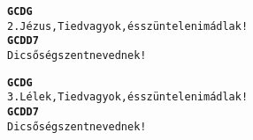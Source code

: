 \begin{minipage}{\textwidth}
\kottastart
{}
\kottaend
\begin{minipage}{\textwidth}
\begin{alltt}
\textbf{    G           C          D         G}
2. Jézus, Tied vagyok, és szüntelen imádlak!
\textbf{    G         C         D  D7}
   Dicsőség szent nevednek!
\end{alltt}
\vspace{0.0cm}
\versszakspacing
\end{minipage}
\begin{minipage}{\textwidth}
\begin{alltt}
\textbf{    G           C          D         G}
3. Lélek, Tied vagyok, és szüntelen imádlak!
\textbf{    G         C         D  D7}
   Dicsőség szent nevednek!
\end{alltt}
\vspace{0.0cm}
\versszakspacing
\end{minipage}
\end{minipage}
~\vspace{1.0cm}
\newline

